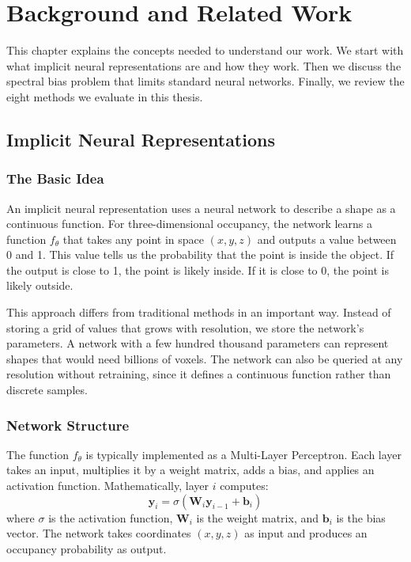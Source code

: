 \chapter{Background and Related Work}
\label{ch:background}

This chapter explains the concepts needed to understand our work. We start with what implicit neural representations are and how they work. Then we discuss the spectral bias problem that limits standard neural networks. Finally, we review the eight methods we evaluate in this thesis.

\section{Implicit Neural Representations}

\subsection{The Basic Idea}

An implicit neural representation uses a neural network to describe a shape as a continuous function. For three-dimensional occupancy, the network learns a function $f_\theta$ that takes any point in space $(x, y, z)$ and outputs a value between 0 and 1. This value tells us the probability that the point is inside the object. If the output is close to 1, the point is likely inside. If it is close to 0, the point is likely outside.

This approach differs from traditional methods in an important way. Instead of storing a grid of values that grows with resolution, we store the network's parameters. A network with a few hundred thousand parameters can represent shapes that would need billions of voxels. The network can also be queried at any resolution without retraining, since it defines a continuous function rather than discrete samples.

\subsection{Network Structure}

The function $f_\theta$ is typically implemented as a Multi-Layer Perceptron. Each layer takes an input, multiplies it by a weight matrix, adds a bias, and applies an activation function. Mathematically, layer $i$ computes:
\begin{equation}
    \mathbf{y}_i = \sigma(\mathbf{W}_i \mathbf{y}_{i-1} + \mathbf{b}_i)
\end{equation}
where $\sigma$ is the activation function, $\mathbf{W}_i$ is the weight matrix, and $\mathbf{b}_i$ is the bias vector. The network takes coordinates $(x, y, z)$ as input and produces an occupancy probability as output.

